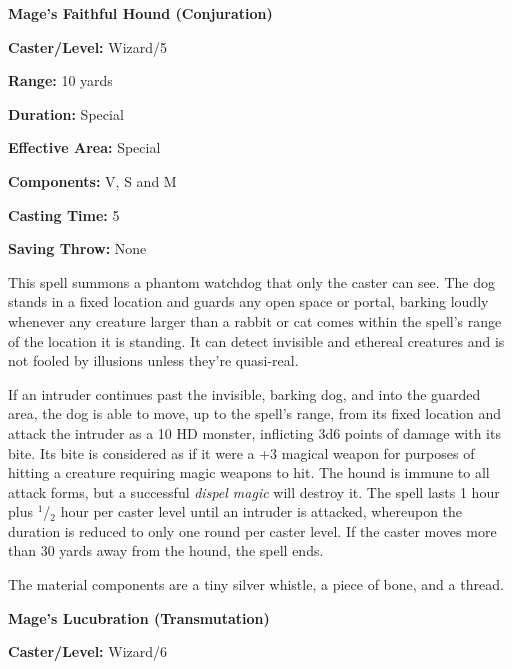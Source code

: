 \begin{multicols}{2}
\vspace{1em}

\noindent
\begin{minipage}{\columnwidth}

\noindent \textbf{Mage's Faithful Hound (Conjuration)}

\noindent \textbf{Caster/Level:} Wizard/5

\noindent \textbf{Range:} 10 yards

\noindent \textbf{Duration:} Special

\noindent \textbf{Effective Area:} Special

\noindent \textbf{Components:} V, S and M

\noindent \textbf{Casting Time:} 5

\noindent \textbf{Saving Throw:} None

\end{minipage}

This spell summons a phantom watchdog that only the caster can see.  The dog stands in a fixed location and guards any open space or portal, barking loudly whenever any creature larger than a rabbit or cat comes within the spell's range of the location it is standing.  It can detect invisible and ethereal creatures and is not fooled by illusions unless they're quasi-real.  

If an intruder continues past the invisible, barking dog, and into the guarded area, the dog is able to move, up to the spell's range, from its fixed location and attack the intruder as a 10 HD monster, inflicting 3d6 points of damage with its bite.  Its bite is considered as if it were a +3 magical weapon for purposes of hitting a creature requiring magic weapons to hit.  The hound is immune to all attack forms, but a successful \textit{dispel magic} will destroy it.  The spell lasts 1 hour plus $^1$/$_2$ hour per caster level until an intruder is attacked, whereupon the duration is reduced to only one round per caster level.  If the caster moves more than 30 yards away from the hound, the spell ends.  

The material components are a tiny silver whistle, a piece of bone, and a thread.

\vspace{1em}

\noindent
\begin{minipage}{\columnwidth}

\noindent \textbf{Mage's Lucubration (Transmutation)}

\noindent \textbf{Caster/Level:} Wizard/6


\end{minipage}
\end{multicols}
